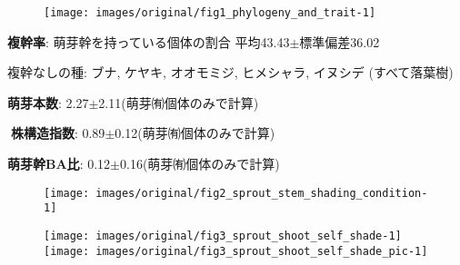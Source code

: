 \documentclass[a0, 30pt, plainboxedsections]{sciposter} %
\begin{document}
\begin{multicols}{2}

\begin{mdframed}[style=subsection.frame,frametitle={\textbf{\huge{\ding{192}}\LARGE{25種の株構造は種間で大きく異なる}}}]

\begin{figure}
  \centering
    \texttt{[image: images/original/fig1\_phylogeny\_and\_trait-1]}
\end{figure}

\vspace{-1em}
\faCaretRight \textbf{複幹率}{\small: 萌芽幹を持っている個体の割合} 平均43.43$\pm$標準偏差36.02


{\small
\hspace*{4.5em}複幹なしの種: ブナ, ケヤキ, オオモミジ, ヒメシャラ, イヌシデ (すべて落葉樹)

}

\faCaretRight \textbf{萌芽本数}: 2.27$\pm$2.11{\small(萌芽㈲個体のみで計算)}

\faCaretRight \textbf{株構造指数}: 0.89$\pm$0.12{\small(萌芽㈲個体のみで計算)}


\faCaretRight \textbf{萌芽幹BA比}: 0.12$\pm$0.16{\small(萌芽㈲個体のみで計算)}

\end{mdframed}

\begin{mdframed}[style=subsection.frame,frametitle=\textbf{\huge{\ding{194}}\LARGE{萌芽性が強い種ほど自己被陰率が下がる}}]

\begin{figure}
 \begin{minipage}{0.25\hsize}
  \centering
   \texttt{[image: images/original/fig2\_sprout\_stem\_shading\_condition-1]}
 \end{minipage}
 \begin{minipage}{0.75\hsize}
  \centering
   \texttt{[image: images/original/fig3\_sprout\_shoot\_self\_shade-1]}
   \texttt{[image: images/original/fig3\_sprout\_shoot\_self\_shade\_pic-1]}
 \end{minipage}
\end{figure}


\end{mdframed}
\end{multicols}
\end{document}
